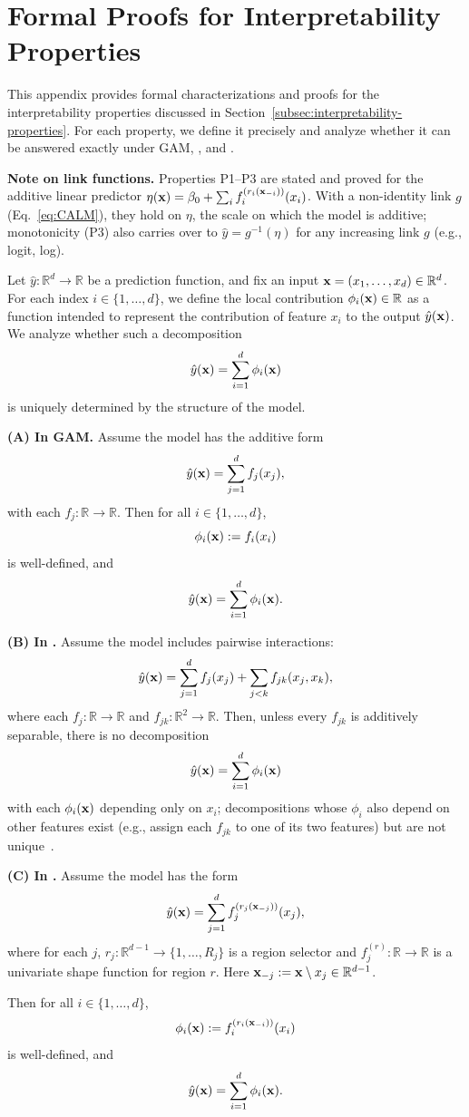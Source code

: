 \newpage
\section{Formal Proofs for Interpretability Properties}
\label{app:interpretability}

This appendix provides formal characterizations and proofs for the interpretability properties discussed in Section~\ref{subsec:interpretability-properties}. For each property, we define it precisely and analyze whether it can be answered exactly under  GAM, \gamm, and \method{}.

\textbf{Note on link functions.} Properties P1--P3 are stated and proved for the additive linear predictor $\eta(\mathbf{x}) = \beta_0 + \sum_i f_i^{(r_i(\mathbf{x}_{-i}))}(x_i)$. With a non-identity link $g$ (Eq.~\eqref{eq:CALM}), they hold on $\eta$, the scale on which the model is additive; monotonicity (P3) also carries over to $\hat{y} = g^{-1}(\eta)$ for any increasing link $g$ (e.g., logit, log).

\begin{proposition}

Let \( \hat{y} : \mathbb{R}^d \to \mathbb{R} \) be a prediction function, and fix an input \( \mathbf{x} = (x_1, \dots, x_d) \in \mathbb{R}^d \). For each index \( i \in \{1, \dots, d\} \), we define the local contribution \( \phi_i(\mathbf{x}) \in \mathbb{R} \) as a function intended to represent the contribution of feature \( x_i \) to the output \( \hat{y}(\mathbf{x}) \). We analyze whether such a decomposition
\[
\hat{y}(\mathbf{x}) = \sum_{i=1}^d \phi_i(\mathbf{x})
\]
is uniquely determined by the structure of the model.

\textbf{(A) In GAM.}
Assume the model has the additive form
\[
\hat{y}(\mathbf{x}) = \sum_{j=1}^d f_j(x_j),
\]
with each \( f_j : \mathbb{R} \to \mathbb{R} \). Then for all \( i \in \{1, \dots, d\} \),
\[
\phi_i(\mathbf{x}) := f_i(x_i)
\]
is well-defined, and
\[
\hat{y}(\mathbf{x}) = \sum_{i=1}^d \phi_i(\mathbf{x}).
\]

\textbf{(B) In \gamm.}
Assume the model includes pairwise interactions:
\[
\hat{y}(\mathbf{x}) = \sum_{j=1}^d f_j(x_j) + \sum_{j<k} f_{jk}(x_j, x_k),
\]
where each \( f_j : \mathbb{R} \to \mathbb{R} \) and \( f_{jk} : \mathbb{R}^2 \to \mathbb{R} \). Then, unless every \( f_{jk} \) is additively separable, there is no decomposition
\[
\hat{y}(\mathbf{x}) = \sum_{i=1}^d \phi_i(\mathbf{x})
\]
with each \( \phi_i(\mathbf{x}) \) depending only on \( x_i \); decompositions whose \( \phi_i \) also depend on other features exist (e.g., assign each \( f_{jk} \) to one of its two features) but are not unique~\cite{hiabu2023unifying, fumagalli2025unifying, bordt2023shapley}.

\textbf{(C) In \method{}.}
Assume the model has the form
\[
\hat{y}(\mathbf{x}) = \sum_{j=1}^d f_j^{(r_j(\mathbf{x}_{-j}))}(x_j),
\]
where for each \( j \), \( r_j : \mathbb{R}^{d-1} \to \{1, \dots, R_j\} \) is a region selector and \( f_j^{(r)} : \mathbb{R} \to \mathbb{R} \) is a univariate shape function for region \( r \). Here \( \mathbf{x}_{-j} := \mathbf{x} \setminus x_j \in \mathbb{R}^{d-1} \).

Then for all \( i \in \{1, \dots, d\} \),
\[
\phi_i(\mathbf{x}) := f_i^{(r_i(\mathbf{x}_{-i}))}(x_i)
\]
is well-defined, and
\[
\hat{y}(\mathbf{x}) = \sum_{i=1}^d \phi_i(\mathbf{x}).
\]
\end{proposition}


